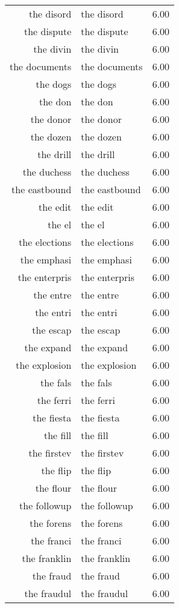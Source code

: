 \begin{table}[ht]
\begin{tabular}{rlr}
  the disord & the disord & 6.00 \\ 
  the dispute & the dispute & 6.00 \\ 
  the divin & the divin & 6.00 \\ 
  the documents & the documents & 6.00 \\ 
  the dogs & the dogs & 6.00 \\ 
  the don & the don & 6.00 \\ 
  the donor & the donor & 6.00 \\ 
  the dozen & the dozen & 6.00 \\ 
  the drill & the drill & 6.00 \\ 
  the duchess & the duchess & 6.00 \\ 
  the eastbound & the eastbound & 6.00 \\ 
  the edit & the edit & 6.00 \\ 
  the el & the el & 6.00 \\ 
  the elections & the elections & 6.00 \\ 
  the emphasi & the emphasi & 6.00 \\ 
  the enterpris & the enterpris & 6.00 \\ 
  the entre & the entre & 6.00 \\ 
  the entri & the entri & 6.00 \\ 
  the escap & the escap & 6.00 \\ 
  the expand & the expand & 6.00 \\ 
  the explosion & the explosion & 6.00 \\ 
  the fals & the fals & 6.00 \\ 
  the ferri & the ferri & 6.00 \\ 
  the fiesta & the fiesta & 6.00 \\ 
  the fill & the fill & 6.00 \\ 
  the firstev & the firstev & 6.00 \\ 
  the flip & the flip & 6.00 \\ 
  the flour & the flour & 6.00 \\ 
  the followup & the followup & 6.00 \\ 
  the forens & the forens & 6.00 \\ 
  the franci & the franci & 6.00 \\ 
  the franklin & the franklin & 6.00 \\ 
  the fraud & the fraud & 6.00 \\ 
  the fraudul & the fraudul & 6.00 \\ 

\end{tabular}
\end{table}
